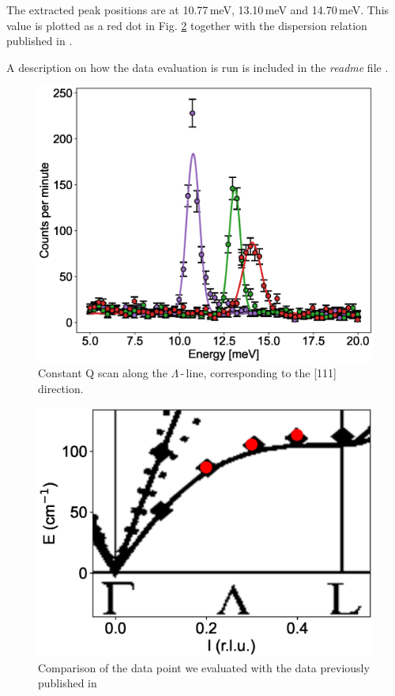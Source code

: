 \documentclass[aps,pra,reprint,amsmath,amssymb,superscriptaddress,showkeys]{revtex4-1}
\begin{document}
The extracted peak positions are at 10.77\,meV, 13.10\,meV and 14.70\,meV.
This value is plotted as a red dot in Fig. \ref{fig2} together with the dispersion relation published in \cite{Aouissi}.

A description on how the data evaluation is run is included in the \emph{readme} file \cite{data-evaluation}.


\begin{figure}
    \includegraphics[width=1.0\linewidth]{energy-scan.eps}
    \caption{\label{fig1} Constant Q scan along the $\Lambda$\,-\,line, corresponding to the [111] direction.}
\end{figure}

\begin{figure}
    \includegraphics[width=1.0\linewidth]{dispersion.eps}
    \caption{Comparison of the data point we evaluated with the data previously published in \cite{Aouissi} }
    \label{fig2}
\end{figure}
\end{document}
